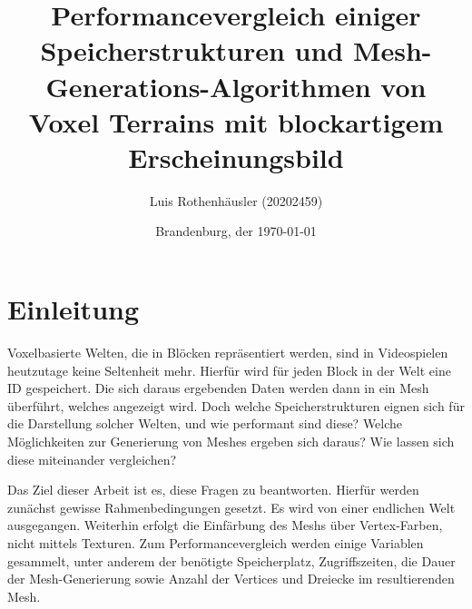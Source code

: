 \documentclass[
a4paper,     %
12pt         %
]{scrartcl}  %
\title{Performancevergleich einiger Speicherstrukturen und Mesh-Generations-Algorithmen von Voxel Terrains mit blockartigem Erscheinungsbild}
\author{Luis Rothenh\"ausler (20202459)}
\date{Brandenburg, der \today{}}
\begin{document}

 \maketitle

\tableofcontents





\newpage

\section{Einleitung}
Voxelbasierte Welten, die in Blöcken repräsentiert werden, sind in Videospielen heutzutage keine Seltenheit mehr. Hierfür wird für jeden Block in der Welt eine ID gespeichert. Die sich daraus ergebenden Daten werden dann in ein Mesh überführt, welches angezeigt wird. Doch welche Speicherstrukturen eignen sich für die Darstellung solcher Welten, und wie performant sind diese? Welche Möglichkeiten zur Generierung von Meshes ergeben sich daraus? Wie lassen sich diese miteinander vergleichen? 

Das Ziel dieser Arbeit ist es, diese Fragen zu beantworten. Hierfür werden zunächst gewisse Rahmenbedingungen gesetzt. Es wird von einer endlichen Welt ausgegangen. Weiterhin erfolgt die Einfärbung des Meshs über Vertex-Farben, nicht mittels Texturen. Zum Performancevergleich werden einige Variablen gesammelt, unter anderem der benötigte Speicherplatz, Zugriffszeiten, die Dauer der Mesh-Generierung sowie Anzahl der Vertices und Dreiecke im resultierenden Mesh.
\end{document}
